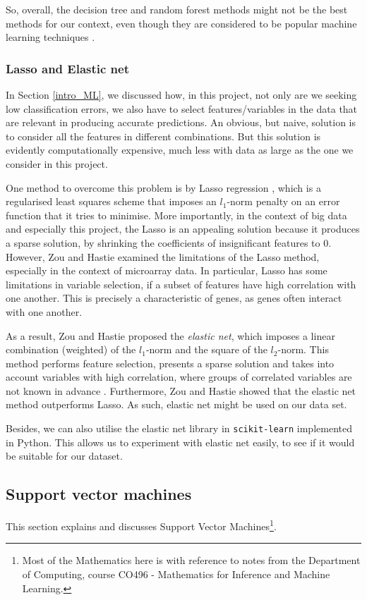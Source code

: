 \documentclass[12pt, twoside, a4paper]{article}
\begin{document}
So, overall, the decision tree and random forest methods might not be the best methods for our context, even though they are considered to be popular machine learning techniques \cite{RefWorks:103}.

\subsubsection{Lasso and Elastic net}
In Section \ref{intro_ML}, we discussed how, in this project, not only are we seeking low classification errors, we also have to select features/variables in the data that are relevant in producing accurate predictions. An obvious, but naive, solution is to consider all the features in different combinations. But this solution is evidently computationally expensive, much less with data as large as the one we consider in this project.

One method to overcome this problem is by Lasso regression \cite{RefWorks:94}, which is a regularised least squares scheme that imposes an $l_1$-norm penalty on an error function that it tries to minimise. More importantly, in the context of big data and especially this project, the Lasso is an appealing solution because it produces a sparse solution, by shrinking the coefficients of insignificant features to 0. However, Zou and Hastie \cite{RefWorks:96} examined the limitations of the Lasso method, especially in the context of microarray data. In particular, Lasso has some limitations in variable selection, if a subset of features have high correlation with one another. This is precisely a characteristic of genes, as genes often interact with one another.

As a result, Zou and Hastie proposed the \textit{elastic net}, which imposes a linear combination (weighted) of the $l_1$-norm and the square of the $l_2$-norm. This method performs feature selection, presents a sparse solution and takes into account variables with high correlation, where groups of correlated variables are not known in advance \cite{RefWorks:93}. Furthermore, Zou and Hastie showed that the elastic net method outperforms Lasso. As such, elastic net might be used on our data set.

Besides, we can also utilise the elastic net library in \texttt{scikit-learn} implemented in Python. This allows us to experiment with elastic net easily, to see if it would be suitable for our dataset.


\subsection{Support vector machines}
This section explains and discusses Support Vector Machines\footnote{Most of the Mathematics here is with reference to notes from the Department of Computing, course CO496 - Mathematics for Inference and Machine Learning.}.
\end{document}
